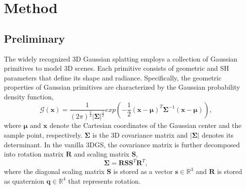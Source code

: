 \documentclass[lettersize,journal]{IEEEtran}
\begin{document}
\section{Method}
\label{sec:method}

\subsection{Preliminary}
The widely recognized 3D Gaussian splatting employs a collection of Gaussian primitives to model 3D scenes. Each primitive consists of geometric and SH parameters that define its shape and radiance. Specifically, the geometric properties of Gaussian primitives are characterized by the Gaussian probability density function,
\begin{equation}
    \mathcal{G}(\boldsymbol{x}) = \frac{1}{(2\pi)^\frac{3}{2}|\boldsymbol{\Sigma}|^{\frac{1}{2}}}exp(-\frac{1}{2}(\boldsymbol{x}-\boldsymbol{\mu})^T\boldsymbol{\Sigma}^{-1}(\boldsymbol{x}-\boldsymbol{\mu})),
\end{equation}
where $\boldsymbol{\mu}$ and $\boldsymbol{x}$ denote the Cartesian coordinates of the Gaussian center and the sample point, respectively. $\boldsymbol{\Sigma}$ is the 3D covariance matrix and $|\boldsymbol{\Sigma}|$ denotes its determinant. In the vanilla 3DGS, the covariance matrix is further decomposed into rotation matrix $\boldsymbol{R}$ and scaling matrix $\boldsymbol{S}$,
\begin{equation}
    \boldsymbol{\Sigma} = \boldsymbol{RSS}^T\boldsymbol{R}^T,
\end{equation}
where the diagonal scaling matrix $\boldsymbol{S}$ is stored as a vector $\boldsymbol{s}\in \mathbb{R}^3$ and $\boldsymbol{R}$ is stored as quaternion $\boldsymbol{q}\in \mathbb{R}^4$ that represents rotation. 
\end{document}
